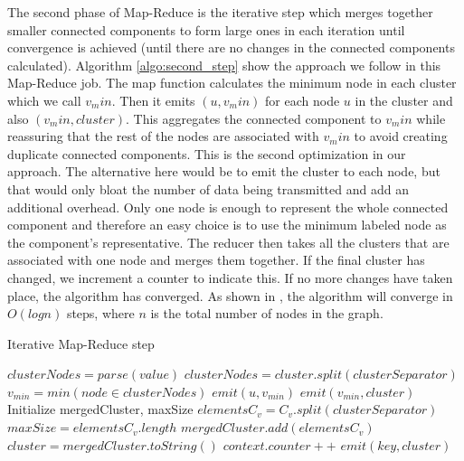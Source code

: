 The second phase of Map-Reduce is the iterative step which merges together smaller connected components to form large ones in each iteration until convergence is achieved (\ie until there are no changes in the connected components calculated). Algorithm \ref{algo:second_step} show the approach we follow in this Map-Reduce job. The map function calculates the minimum node in each cluster which we call $v_min$. Then it emits $(u, v_min)$ for each node $u$ in the cluster and also $(v_min, cluster)$. This aggregates the connected component to $v_min$ while reassuring that the rest of the nodes are associated with $v_min$ to avoid creating duplicate connected components. This is the second optimization in our approach. The alternative here would be to emit the cluster to each node, but that would only bloat the number of data being transmitted and add an additional overhead. Only one node is enough to represent the whole connected component and therefore an easy choice is to use the minimum labeled node as the component's representative. The reducer then takes all the clusters that are associated with one node and merges them together. If the final cluster has changed, we increment a counter to indicate this. If no more changes have taken place, the algorithm has converged. As shown in \cite{rastogi}, the algorithm will converge in $O(logn)$ steps, where $n$ is the total number of nodes in the graph.

\begin{algorithm}[t]
	\caption{Iterative Map-Reduce step}
	\label{algo:second_step}
	\begin{algorithmic}[1]
			\State $clusterNodes = parse(value)$
			\State $clusterNodes = cluster.split(clusterSeparator)$
			\State $v_{min} = min(node \in clusterNodes)$
				\State $emit(u, v_{min})$
			\EndFor
			\State $emit(v_{min}, cluster)$
		\EndFunction
			\State Initialize mergedCluster, maxSize
				\State $elementsC_v = C_v.split(clusterSeparator)$
					\State $maxSize = elementsC_v.length$ 
				\EndIf
				\State $mergedCluster.add(elementsC_v)$
			\EndFor
			\State $cluster = mergedCluster.toString()$
				\State $context.counter++$
			\EndIf
			\State $emit(key, cluster)$
		\EndFunction
	\end{algorithmic}
\end{algorithm}


